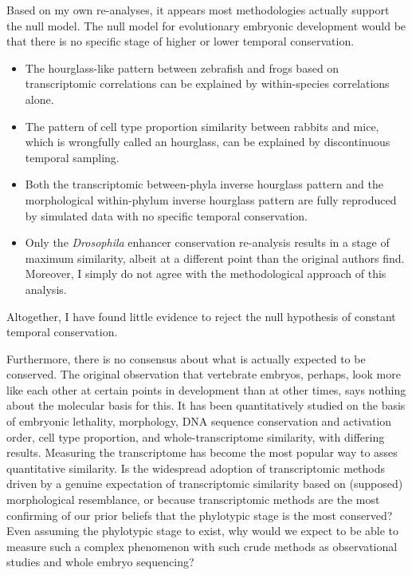 Based on my own re-analyses, it appears most methodologies actually support the null model. The null model for evolutionary embryonic development would be that there is no specific stage of higher or lower temporal conservation. 
\begin{itemize}
    \item The hourglass-like pattern between zebrafish and frogs based on transcriptomic correlations can be explained by within-species correlations alone.
    \item The pattern of cell type proportion similarity between rabbits and mice, which is wrongfully called an hourglass, can be explained by discontinuous temporal sampling.
    \item Both the transcriptomic between-phyla inverse hourglass pattern and the morphological within-phylum inverse hourglass pattern are fully reproduced by simulated data with no specific temporal conservation.
    \item Only the \textit{Drosophila} enhancer conservation re-analysis results in a stage of maximum similarity, albeit at a different point than the original authors find. Moreover, I simply do not agree with the methodological approach of this analysis.
\end{itemize}
\noindent
Altogether, I have found little evidence to reject the null hypothesis of constant temporal conservation.

Furthermore, there is no consensus about what is actually expected to be conserved. The original observation that vertebrate embryos, perhaps, look more like each other at certain points in development than at other times, says nothing about the molecular basis for this. It has been quantitatively studied on the basis of embryonic lethality\cite{Uchida2018}, morphology\cite{OlafRP2003,Cordero2020}, DNA sequence conservation\cite{Piasecka2013,Quint2012,Liu2021} and activation order\cite{Uesaka2019}, cell type proportion\cite{Mayshar2023}, and whole-transcriptome similarity\cite{Piasecka2013,Irie2011,marletaz2018,Liu2020,Leong2021,PerezPosada2022,Kalinka2010}, with differing results. Measuring the transcriptome has become the most popular way to asses quantitative similarity. Is the widespread adoption of transcriptomic methods driven by a genuine expectation of transcriptomic similarity based on (supposed) morphological resemblance, or because transcriptomic methods are the most confirming of our prior beliefs that the phylotypic stage is the most conserved? Even assuming the phylotypic stage to exist, why would we expect to be able to measure such a complex phenomenon with such crude methods as observational studies and whole embryo sequencing?

